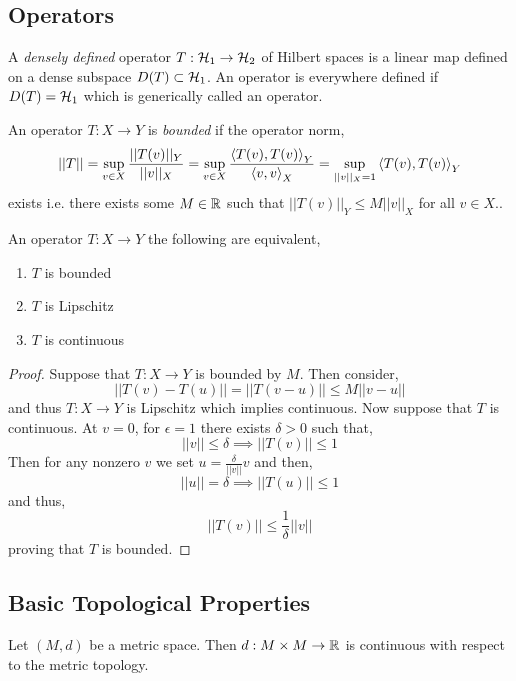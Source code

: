 \documentclass[12pt]{article}
\begin{document}
\subsection{Operators}

\begin{defn}
A \textit{densely defined} operator $T : \mathcal{H}_1 \to \mathcal{H}_2$ of Hilbert spaces is a linear map defined on a dense subspace $D(T) \subset \mathcal{H}_1$. An operator is everywhere defined if $D(T) = \mathcal{H}_1$ which is generically called an operator. 
\end{defn}

\begin{defn}
An operator $T : X \to Y$ is \textit{bounded} if the operator norm,
\[ || T || = \sup_{v \in X} \frac{|| T(v) ||_{Y}}{|| v ||_{X}} = \sup_{v \in X} \frac{\left< T(v) , T(v) \right>_{Y}}{\left< v , v \right>_{X}} = \sup_{|| v ||_{X} = 1} \left< T(v) , T(v) \right>_{Y} \]
exists i.e. there exists some $M \in \mathbb{R}$ such that $||T(v)||_{Y} \le M || v ||_{X}$ for all $v \in X$..
\end{defn}

\begin{prop}
An operator $T : X \to Y$ the following are equivalent,
\begin{enumerate}
\item $T$ is bounded
\item $T$ is Lipschitz
\item $T$ is continuous
\end{enumerate}
\end{prop}

\begin{proof}
Suppose that $T : X \to Y$ is bounded by $M$. Then consider,
\[ || T(v) - T(u) || = || T (v - u) || \le M || v - u || \]
and thus $T : X \to Y$ is Lipschitz which implies continuous. Now suppose that $T$ is continuous. At $v = 0$, for $\epsilon = 1$ there exists $\delta > 0$ such that,
\[ || v || \le \delta \implies || T(v) || \le 1 \]
Then for any nonzero $v$ we set $u = \frac{\delta}{||v||} v$ and then,
\[ ||u|| = \delta \implies || T(u) || \le 1 \]
and thus,
\[ || T(v) || \le \frac{1}{\delta} || v || \]
proving that $T$ is bounded.
\end{proof}

\subsection{Basic Topological Properties}


\begin{prop}
Let $(M, d)$ be a metric space. Then $d : M \times M \to \mathbb{R}$ is continuous with respect to the metric topology.
\end{prop}
\end{document}
